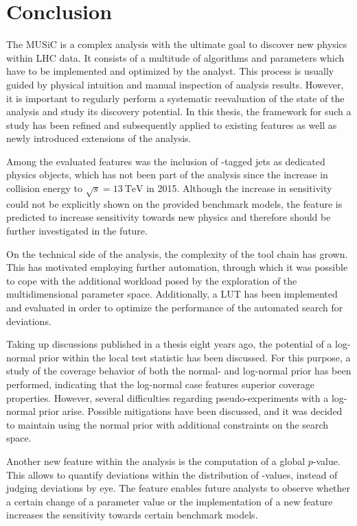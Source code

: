 
\chapter{Conclusion}
The \acf{MUSiC} is a complex analysis with the ultimate goal to discover new physics within \ac{LHC} data. It consists of a multitude of algorithms and parameters which have to be implemented and optimized by the analyst. This process is usually guided by physical intuition and manual inspection of analysis results. However, it is important to regularly perform a systematic reevaluation of the state of the analysis and  study its discovery potential.
In this thesis, the framework for such a study has been refined and subsequently applied to existing features as well as newly introduced extensions of the analysis.

Among the evaluated features was the inclusion of \Pqb-tagged jets as dedicated physics objects, which has not been part of the analysis since the increase in collision energy to $\sqrt{s} = \SI{13}{\TeV}$ in 2015. Although the increase in sensitivity could not be explicitly shown on the provided benchmark models, the feature is predicted to increase sensitivity towards new physics and therefore should be further investigated in the future.

On the technical side of the analysis, the complexity of the tool chain has grown. This has motivated employing further automation, through which it was possible to cope with the additional workload posed by the exploration of the multidimensional parameter space.
Additionally, a \acl{LUT} has been implemented and evaluated in order to optimize the performance of the automated search for deviations.

Taking up discussions published in a thesis eight years ago\cite{Schmitz:ModelUnspecificSearch}, the potential of a log-normal prior within the local test statistic has been discussed. For this purpose, a study of the coverage behavior of both the normal- and log-normal prior has been performed, indicating that the log-normal case features superior coverage properties. However, several difficulties regarding pseudo-experiments with a log-normal prior arise. Possible mitigations have been discussed, and it was decided to maintain using the normal prior with additional constraints on the search space.

Another new feature within the analysis is the computation of a global $p$-value. This allows to quantify deviations within the distribution of \ptilde-values, instead of judging deviations by eye. The feature enables future analysts to observe whether a certain change of a parameter value or the implementation of a new feature increases the sensitivity towards certain benchmark models.

